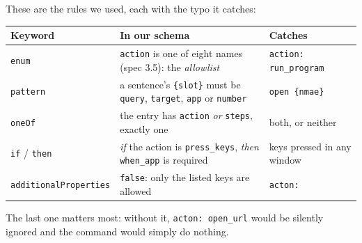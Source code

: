 \documentclass[11pt,a4paper]{article}
\begin{document}
These are the rules we used, each with the typo it catches:
\begin{center}
\begin{tabularx}{\textwidth}{l p{} X}
\toprule
\textbf{Keyword} & \textbf{In our schema} & \textbf{Catches} \\
\midrule
\texttt{enum} & \texttt{action} is one of eight names (spec 3.5): the \emph{allowlist} &
  \texttt{action: run\_program} \\
\texttt{pattern} & a sentence's \texttt{\{slot\}} must be \texttt{query}, \texttt{target},
  \texttt{app} or \texttt{number} & \texttt{open \{nmae\}} \\
\texttt{oneOf} & the entry has \texttt{action} \emph{or} \texttt{steps}, exactly one &
  both, or neither \\
\texttt{if} / \texttt{then} & \emph{if} the action is \texttt{press\_keys}, \emph{then}
  \texttt{when\_app} is required & keys pressed in any window \\
\texttt{additionalProperties} & \texttt{false}: only the listed keys are allowed &
  \texttt{acton:} \\
\bottomrule
\end{tabularx}
\end{center}
\noindent The last one matters most: without it, \texttt{acton: open\_url} would be silently
ignored and the command would simply do nothing.
\end{document}
